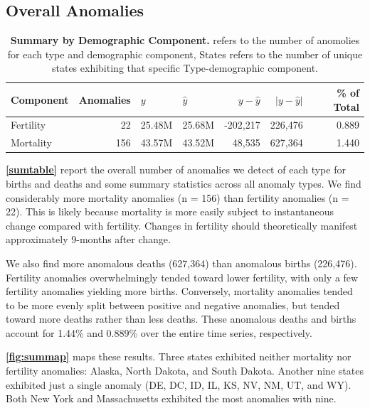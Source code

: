 \documentclass[12pt]{article}
\begin{document}
\hypertarget{overall-anomalies}{%
\subsection{Overall Anomalies}\label{overall-anomalies}}

\begin{table}

\caption{\label{tab:unnamed-chunk-1}\textbf{Summary by Demographic Component.}  refers to the number of anomolies for each type and demographic component, States refers to the number of unique states exhibiting that specific Type-demographic component. \label{sumtable}}
\centering
\begin{tabular}[t]{lrllrrr}
\toprule
Component & Anomalies & $y$ & $\hat{y}$ & $y-\hat{y}$ & $|y-\hat{y}|$ & \% of Total\\
\midrule
Fertility & 22 & 25.48M & 25.68M & -202,217 & 226,476 & 0.889\\
Mortality & 156 & 43.57M & 43.52M & 48,535 & 627,364 & 1.440\\
\bottomrule
\end{tabular}
\end{table}

\textbf{\autoref{sumtable}} report the overall number of anomalies we
detect of each type for births and deaths and some summary statistics
across all anomaly types. We find considerably more mortality anomalies
(n = 156) than fertility anomalies (n = 22). This is likely because
mortality is more easily subject to instantaneous change compared with
fertility. Changes in fertility should theoretically manifest
approximately 9-months after change.

We also find more anomalous deaths (627,364) than anomalous births
(226,476). Fertility anomalies overwhelmingly tended toward lower
fertility, with only a few fertility anomalies yielding more births.
Conversely, mortality anomalies tended to be more evenly split between
positive and negative anomalies, but tended toward more deaths rather
than less deaths. These anomalous deaths and births account for 1.44\%
and 0.889\% over the entire time series, respectively.

\textbf{\autoref{fig:summap}} maps these results. Three states exhibited
neither mortality nor fertility anomalies: Alaska, North Dakota, and
South Dakota. Another nine states exhibited just a single anomaly (DE,
DC, ID, IL, KS, NV, NM, UT, and WY). Both New York and Massachusetts
exhibited the most anomalies with nine.
\end{document}
